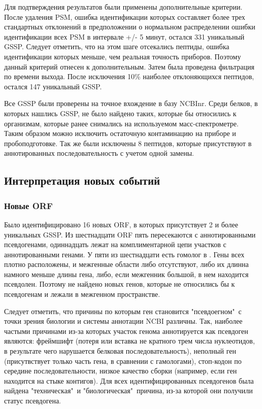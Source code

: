 Для подтверждения результатов были применены дополнительные критерии. После удаления PSM, ошибка идентификации которых составляет более трех стандартных отклонений в предположении о нормальном распределении ошибки идентификации всех PSM в интервале +/- 5 минут, остался 331 уникальный GSSP. Следует отметить, что на этом шаге отсекались пептиды, ошибка идентификации которых меньше, чем реальная точность приборов. Поэтому данный критерий отнесен к дополнительным. Затем была проведена фильтрация по времени выхода. После исключения 10\% наиболее отклоняющихся пептидов, остался 147 уникальный GSSP. 

Все GSSP были проверены на точное вхождение в базу NCBInr. Среди белков, в которых нашлись GSSP, не было найдено  таких, которые бы относились к организмам, которые ранее снимались на используемом масс-спектрометре. Таким образом можно исключить остаточную контаминацию на приборе и пробоподготовке. Так же были исключены 8 пептидов, которые присутствуют в аннотированных последовательность  с учетом одной замены.

\subsection{Интерпретация новых событий}
\subsubsection{Новые ORF}
Было идентифицировано 16 новых ORF, в которых присутствует 2 и более уникальных GSSP. Из шестнадцати ORF пять пересекаются с аннотированными псевдогенами, одиннадцать лежат на комплиментарной цепи участков с аннотированными генами. У пяти из шестнадцати есть гомолог в . Гены всех  плотно расположены, и межгенные области либо отсутствуют, либо их длинна намного меньше длины гена, либо, если межгенник большой, в нем находится псевдолен. Поэтому не найдено новых генов, которые не относились бы к псевдогенам и лежали в межгенном пространстве.

Следует отметить, что причины по которым ген становится "псевдоегном"\ с точки зрения биологии и системы аннотации NCBI различны. Так, наиболее частыми причинами из-за которых участок генома аннотируется как псевдоген являются: фреймшифт (потеря или вставка не кратного трем числа нуклеотидов, в результате чего нарушается белковая последовательность), неполный ген (присутвствует только часть гена, в сравнении с гамологами), стоп-кодон по середине последовательности, низкое качество сборки (например, если ген находится на стыке контигов). Для всех идентифицированных псевдогенов была найдена "техническая"\ и "биологическая"\ причина, из-за которой они получили статус псевдогена.

